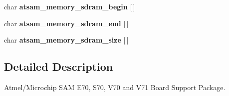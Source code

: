 \begin{DoxyCompactItemize}
char {\bfseries atsam\+\_\+memory\+\_\+sdram\+\_\+begin} \mbox{[}$\,$\mbox{]}
\item 
\mbox{\label{group__RTEMSBSPsARMAtsam_gad346f6107a2f69472ecd1b0b2a057a4b}} 
char {\bfseries atsam\+\_\+memory\+\_\+sdram\+\_\+end} \mbox{[}$\,$\mbox{]}
\item 
\mbox{\label{group__RTEMSBSPsARMAtsam_gab83d2ab261c48e70d6f7a00aa4064c59}} 
char {\bfseries atsam\+\_\+memory\+\_\+sdram\+\_\+size} \mbox{[}$\,$\mbox{]}
\end{DoxyCompactItemize}


\subsection{Detailed Description}
Atmel/\+Microchip S\+AM E70, S70, V70 and V71 Board Support Package. 

